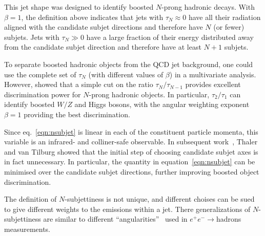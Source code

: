 This jet shape was designed to identify boosted $N$-prong hadronic decays. With $\beta=1$, the definition above indicates that jets with $\tau_N\approx 0$ have all their radiation aligned with the candidate subjet directions and therefore have $N$ (or fewer) subjets. Jets with $\tau_N\gg 0$ have a large fraction of their energy distributed away from the candidate subjet direction and therefore have at least $N+1$ subjets.

To separate boosted hadronic objects from the QCD jet background, one could use the complete set of  $\tau_N$ (with different values of $\beta$) in a multivariate analysis. However, \cite{nsubjettiness} showed that a simple cut on the ratio $\tau_N/\tau_{N-1}$ provides excellent discrimination power for $N$-prong hadronic objects. In particular, $\tau_2/\tau_1$ can identify boosted $W/Z$ and Higgs bosons, with the angular weighting exponent $\beta =1$ providing the best discrimination.

Since eq.~\ref{eqn:nsubjet} is linear in each of the constituent particle momenta, this variable is an infrared- and colliner-safe observable.  In subsequent work~\cite{mininsubjettiness}, Thaler and van Tilburg showed that the initial step of choosing candidate subjet axes is in fact unnecessary. In particular, the quantity in equation~\ref{eqn:nsubjet} can be minimised over the candidate subjet directions, further improving boosted object discrimination.

The definition of $N$-subjettiness is not unique, and different choises can be sued to give different weights to the emissions within a jet. There generalizations of $N$-subjettiness are similar to different ``angularities''~\cite{angularities} used in $e^+e^- \rightarrow$hadrons measurements.




